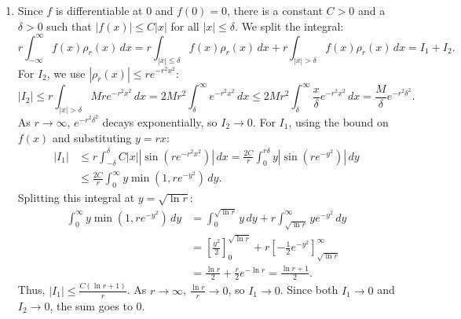 \documentclass{article}
\begin{document}
\begin{enumerate}[label=\fbox{\arabic*}]
\begin{enumerate}[label=(\arabic*)]
          \item Since $f$ is differentiable at $0$ and $f(0)=0$, there is a constant $C > 0$ and a $\delta > 0$ such that $|f(x)| \le C|x|$ for all $|x| \le \delta$. We split the integral:
                \[
                  r \int_{-\infty}^\infty f(x) \rho_r(x) \, dx = r \int_{|x| \le \delta} f(x) \rho_r(x) \, dx + r \int_{|x| > \delta} f(x) \rho_r(x) \, dx = I_1 + I_2.
                \]
                For $I_2$, we use $|\rho_r(x)| \le r e^{-r^2 x^2}$:
                \[
                  |I_2| \le r \int_{|x| > \delta} M r e^{-r^2 x^2} \, dx = 2 M r^2 \int_\delta^\infty e^{-r^2 x^2} \, dx \le 2 M r^2 \int_\delta^\infty \frac{x}{\delta} e^{-r^2 x^2} \, dx = \frac{M}{\delta} e^{-r^2 \delta^2}.
                \]
                As $r \to \infty$, $e^{-r^2 \delta^2}$ decays exponentially, so $I_2 \to 0$.
                For $I_1$, using the bound on $f(x)$ and substituting $y = rx$:
                \begin{align*}
                  |I_1| &\le r \int_{-\delta}^\delta C|x| |\sin(r e^{-r^2 x^2})| \, dx = \frac{2C}{r} \int_0^{r\delta} y |\sin(r e^{-y^2})| \, dy \\
                  &\le \frac{2C}{r} \int_0^\infty y \min(1, r e^{-y^2}) \, dy.
                \end{align*}
                Splitting this integral at $y = \sqrt{\ln r}$:
                \begin{align*}
                  \int_0^\infty y \min(1, r e^{-y^2}) \, dy &= \int_0^{\sqrt{\ln r}} y \, dy + r \int_{\sqrt{\ln r}}^\infty y e^{-y^2} \, dy \\
                  &= \left[ \frac{y^2}{2} \right]_0^{\sqrt{\ln r}} + r \left[ -\frac{1}{2} e^{-y^2} \right]_{\sqrt{\ln r}}^\infty \\
                  &= \frac{\ln r}{2} + \frac{r}{2} e^{-\ln r} = \frac{\ln r + 1}{2}.
                \end{align*}
                Thus, $|I_1| \le \frac{C(\ln r + 1)}{r}$. As $r \to \infty$, $\frac{\ln r}{r} \to 0$, so $I_1 \to 0$.
                Since both $I_1 \to 0$ and $I_2 \to 0$, the sum goes to 0.
        \end{enumerate}


\end{enumerate}
\end{document}
